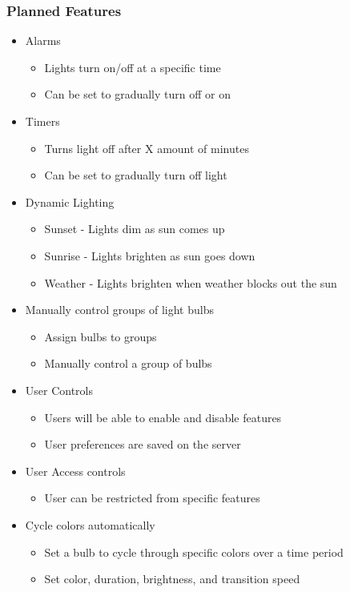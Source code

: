 \documentclass[12pt]{article}
\begin{document}
\subsubsection*{Planned Features}
\begin{itemize}
\item Alarms
\begin{itemize}
\item Lights turn on/off at a specific time
\item Can be set to gradually turn off or on
\end{itemize}
\item Timers	
\begin{itemize}
\item Turns light off after X amount of minutes
\item Can be set to gradually turn off light
\end{itemize}

\item Dynamic Lighting
\begin{itemize}
\item Sunset - Lights dim as sun comes up
\item Sunrise - Lights brighten as sun goes down
\item Weather - Lights brighten when weather blocks out the sun
\end{itemize}

\item Manually control groups of light bulbs
\begin{itemize}
\item Assign bulbs to groups
\item Manually control a group of bulbs
\end{itemize}
\item User Controls
\begin{itemize}
\item Users will be able to enable and disable features
\item User preferences are saved on the server
\end{itemize}

\item User Access controls
\begin{itemize}
\item User can be restricted from specific features
\end{itemize}
	
\item Cycle colors automatically
\begin{itemize}
\item Set a bulb to cycle through specific colors over a time period
\item Set color, duration, brightness, and transition speed
\end{itemize}



\end{itemize}
\end{document}
